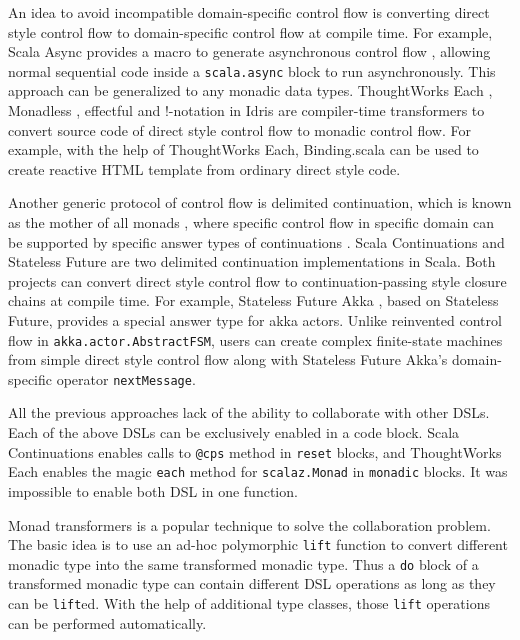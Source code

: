 An idea to avoid incompatible domain-specific control flow is converting direct style control flow to domain-specific control flow at compile time. For example, Scala Async provides a macro to generate asynchronous control flow \cite{haller2013sip}, allowing normal sequential code inside a \lstinline{scala.async} block to run asynchronously. This approach can be generalized to any monadic data types. ThoughtWorks Each \cite{yangbo2015each}, Monadless \cite{flavio2017monadless}, effectful \cite{crockett2013effectful} and !-notation in Idris \cite{brady2013idris} are compiler-time transformers to convert source code of direct style control flow to monadic control flow. For example, with the help of ThoughtWorks Each, Binding.scala\cite{yangbo2016binding} can be used to create reactive HTML template from ordinary direct style code.

Another generic protocol of control flow is delimited continuation, which is known as the mother of all monads \cite{filinski1994representing,piponi2008mother}, where specific control flow in specific domain can be supported by specific answer types of continuations \cite{asai2007polymorphic}. Scala Continuations \cite{rompf2009implementing} and Stateless Future \cite{yangbo2014stateless} are two delimited continuation implementations in Scala. Both projects can convert direct style control flow to continuation-passing style closure chains at compile time. For example, Stateless Future Akka \cite{yangbo2014statelessfutureakka}, based on Stateless Future, provides a special answer type for akka actors. Unlike reinvented control flow in \lstinline{akka.actor.AbstractFSM}, users can create complex finite-state machines from simple direct style control flow along with Stateless Future Akka's domain-specific operator \lstinline{nextMessage}.

All the previous approaches lack of the ability to collaborate with other DSLs. Each of the above DSLs can be exclusively enabled in a code block. Scala Continuations enables calls to \lstinline{@cps} method in \lstinline{reset} blocks, and ThoughtWorks Each enables the magic \lstinline{each} method \cite{yangbo2015each} for \lstinline{scalaz.Monad} in \lstinline{monadic} blocks. It was impossible to enable both DSL in one function.

Monad transformers \cite{liang1995monad} is a popular technique to solve the collaboration problem. The basic idea is to use an ad-hoc polymorphic \lstinline{lift} function to convert different monadic type into the same transformed monadic type. Thus a \lstinline{do} block of a transformed monadic type can contain different DSL operations as long as they can be \lstinline{lift}ed. With the help of additional type classes, those \lstinline{lift} operations can be performed automatically.


